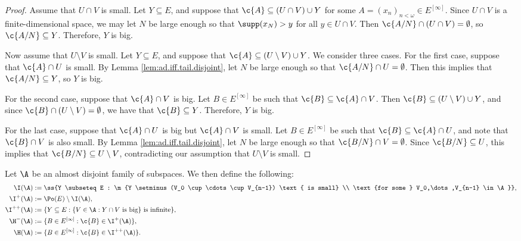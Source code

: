 \documentclass[11pt,reqno]{amsart}
\begin{document}
\begin{proof}
    Assume that $U \cap V$ is small. Let $Y \subseteq E$, and suppose that $\c{A} \subseteq (U \cap V) \cup Y$ for some $A = (x_n)_{n<\omega} \in E^{[\infty]}$. Since $U \cap V$ is a finite-dimensional space, we may let $N$ be large enough so that $\supp(x_N) > y$ for all $y \in U \cap V$. Then $\c{A/N} \cap (U \cap V) = \emptyset$, so $\c{A/N} \subseteq Y$. Therefore, $Y$ is big.

    Now assume that $U \setminus V$ is small. Let $Y \subseteq E$, and suppose that $\c{A} \subseteq (U \setminus V) \cup Y$. We consider three cases. For the first case, suppose that $\c{A} \cap U$ is small. By Lemma \ref{lem:ad.iff.tail.disjoint}, let $N$ be large enough so that $\c{A/N} \cap U = \emptyset$. Then this implies that $\c{A/N} \subseteq Y$, so $Y$ is big.

    For the second case, suppose that $\c{A} \cap V$ is big. Let $B \in E^{[\infty]}$ be such that $\c{B} \subseteq \c{A} \cap V$. Then $\c{B} \subseteq (U \setminus V) \cup Y$, and since $\c{B} \cap (U \setminus V) = \emptyset$, we have that $\c{B} \subseteq Y$. Therefore, $Y$ is big.

    For the last case, suppose that $\c{A} \cap U$ is big but $\c{A} \cap V$ is small. Let $B \in E^{[\infty]}$ be such that $\c{B} \subseteq \c{A} \cap U$, and note that $\c{B} \cap V$ is also small. By Lemma \ref{lem:ad.iff.tail.disjoint}, let $N$ be large enough so that $\c{B/N} \cap V = \emptyset$. Since $\c{B/N} \subseteq U$, this implies that $\c{B/N} \subseteq U \setminus V$, contradicting our assumption that $U \setminus V$ is small.
\end{proof}

\begin{definition}
\label{def:ad.semi-ideals.and.semicoideals}
    Let $\A$ be an almost disjoint family of subspaces. We then define the following:
    \begin{align*}
        \I(\A) &:= \ss{Y \subseteq E : \m{Y \setminus (V_0 \cup \cdots \cup V_{n-1}) \text{ is small} \\ \text{for some } V_0,\dots,V_{n-1} \in \A}}, \\
        \I^+(\A) &:= \Po(E) \setminus \I(\A), \\
        \I^{++}(\A) &:= \{Y \subseteq E : \{V \in \A : Y \cap V \text{ is big}\} \text{ is infinite}\}, \\
        \H^-(\A) &:= \{B \in E^{[\infty]} : \c{B} \in \I^+(\A)\}, \\
        \H(\A) &:= \{B \in E^{[\infty]} : \c{B} \in \I^{++}(\A)\}.
    \end{align*}
\end{definition}
\end{document}
